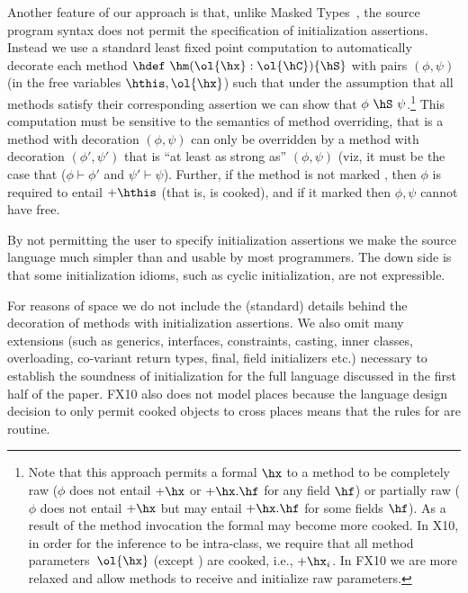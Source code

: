 Another feature of our approach is that, unlike Masked
Types~\cite{XinQi:2009}, the source program syntax does not permit the
specification of initialization assertions. Instead we use a standard
least fixed point computation to automatically decorate each method
$\hdef~\hm(\ol{\hx}:\ol{\hC})\{\hS\}$ with pairs $(\phi, \psi)$ (in the free
variables $\hthis, \ol{\hx}$) such that under the assumption that all
methods satisfy their corresponding assertion we can show that
$\phi~\hS~\psi$.\footnote{Note that this approach permits a formal $\hx$ to a
  method to be completely raw ($\phi$ does not entail $+\hx$ or
  $+\hx.\hf$ for any field $\hf$) or partially raw ($\phi$ does not
  entail $+\hx$ but may entail $+\hx.\hf$ for some fields $\hf$). As a
  result of the method invocation the formal may become more cooked.
  In X10, in order for the inference to be intra-class, we require that all method parameters~$\ol{\hx}$ (except \this) are cooked, i.e.,
    $+\hx_i$. In FX10 we are more relaxed and allow methods to receive and initialize raw parameters.
  }
This computation must be sensitive to the semantics
of method overriding, that is a method with decoration $(\phi,\psi)$
can only be overridden by a method with decoration $(\phi',\psi')$
that is ``at least as strong as'' $(\phi,\psi)$ (viz, it must be the
case that ($\phi \vdash \phi'$ and $\psi' \vdash \psi$). Further, if
the method is not marked , then $\phi$ is required
to entail $+\hthis$ (that is,  is cooked), and if it marked
 then $\phi,\psi$ cannot have  free.



By not permitting the user to specify initialization assertions we
make the source language much simpler than \cite{XinQi:2009} and
usable by most programmers. The down side is that some initialization
idioms, such as cyclic initialization, are not expressible.

For reasons of space we do not include the (standard) details behind
the decoration of methods with initialization assertions. We also omit
many extensions (such as generics, interfaces, constraints, casting,
inner classes, overloading, co-variant return types, final, field initializers etc.) necessary to establish the soundness
of initialization for the full language discussed in the first half of
the paper. FX10 also does not model places because the language design
decision to only permit cooked objects to cross places means that the
rules for  are routine.

